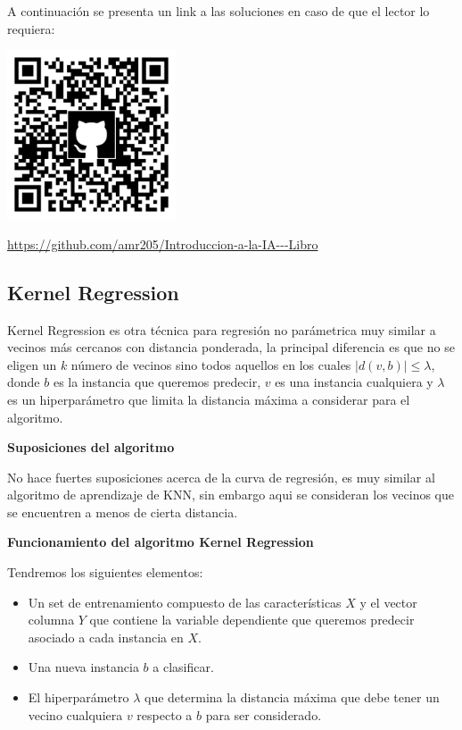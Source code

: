 \documentclass[11pt,fleqn]{book} %
\begin{document}
A continuación se presenta un link a las soluciones en caso de que el lector lo requiera:

\includegraphics[width=5cm]{Pictures/github/libro-ia.png}

\url{https://github.com/amr205/Introduccion-a-la-IA---Libro}
\clearpage

\subsection{Kernel Regression} 

Kernel Regression es otra técnica para regresión no parámetrica muy similar a vecinos más cercanos con distancia ponderada, la principal diferencia es que no se eligen un $k$ número de vecinos sino todos aquellos en los cuales $|d(v,b)|\leq \lambda$, donde $b$ es la instancia que queremos predecir, $v$ es una instancia cualquiera y $\lambda$ es un hiperparámetro que limita la distancia máxima a considerar para el algoritmo.

\textbf{Suposiciones del algoritmo}

No hace fuertes suposiciones acerca de la curva de regresión, es muy similar al algoritmo de aprendizaje de KNN, sin embargo aqui se consideran los vecinos que se encuentren a menos de cierta distancia.

\textbf{Funcionamiento del algoritmo Kernel Regression}

Tendremos los siguientes elementos:

\begin{itemize}
\item Un set de entrenamiento compuesto de las características $X$ y el vector columna $Y$ que contiene la variable dependiente que queremos predecir asociado a cada instancia en $X$.
\item Una nueva instancia $b$ a clasificar. 
\item El hiperparámetro $\lambda$ que determina la distancia máxima que debe tener un 	vecino cualquiera $v$ respecto a $b$ para ser considerado.
\end{itemize}
\end{document}
